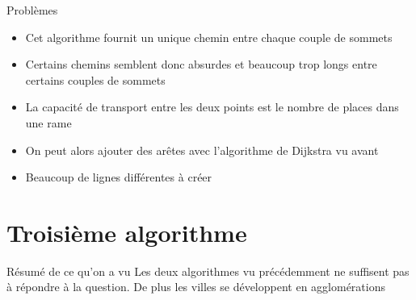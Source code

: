 \documentclass[aspectratio=43,11pt]{beamer}
\begin{document}
\begin{frame}{Problèmes}
    \begin{itemize}
        \item Cet algorithme fournit un unique chemin entre chaque couple de sommets
        \item Certains chemins semblent donc absurdes et beaucoup trop longs entre certains couples de sommets
        \item La capacité de transport entre les deux points est le nombre de places dans une rame
        \item On peut alors ajouter des arêtes avec l'algorithme de Dijkstra vu avant
        \item Beaucoup de lignes différentes à créer
    \end{itemize}
\end{frame}

\section{Troisième algorithme}

\begin{frame}{Résumé de ce qu'on a vu}
    Les deux algorithmes vu précédemment ne suffisent pas à répondre à la question.
    De plus les villes se développent en agglomérations
\end{frame}
\end{document}

